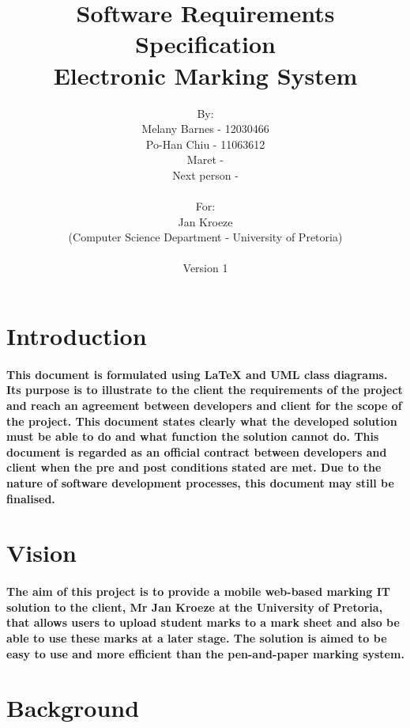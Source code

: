 \documentclass[12pt]{article}
\begin{document}
\title{Software Requirements Specification\\
Electronic Marking System}
\author{By: \\ Melany Barnes - 12030466 \\ Po-Han Chiu - 11063612 \\ Maret - \\ Next person - \\ \\ For: \\ Jan Kroeze \\ (Computer Science Department - University of Pretoria) \\ \\ Version 1 \\}
  \maketitle 
  \tableofcontents
  \section{Introduction}
  \paragraph*{This document is formulated using LaTeX and UML class diagrams. Its purpose is to illustrate to the client the requirements of the project and reach an agreement between developers and client for the scope of the project. This document states clearly what the developed solution must be able to do and what function the solution cannot do. This document is regarded as an official contract between developers and client when the pre and post conditions stated are met. Due to the nature of software development processes, this document may still be finalised.}
  \section{Vision}
  \paragraph*{The aim of this project is to provide a mobile web-based marking IT solution to the client, Mr Jan Kroeze at the University of Pretoria, that allows users to upload student marks to a mark sheet and also be able to use these marks at a later stage. The solution is aimed to be easy to use and more efficient than the pen-and-paper marking system.}
  \section{Background}
\end{document}
